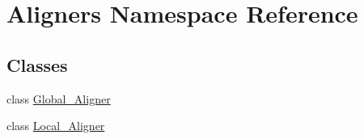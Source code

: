 \hypertarget{namespace_aligners}{}\section{Aligners Namespace Reference}
\label{namespace_aligners}
\subsection*{Classes}
\begin{DoxyCompactItemize}
\item 
class \hyperlink{class_aligners_1_1_global___aligner}{Global\+\_\+\+Aligner}
\item 
class \hyperlink{class_aligners_1_1_local___aligner}{Local\+\_\+\+Aligner}
\end{DoxyCompactItemize}
